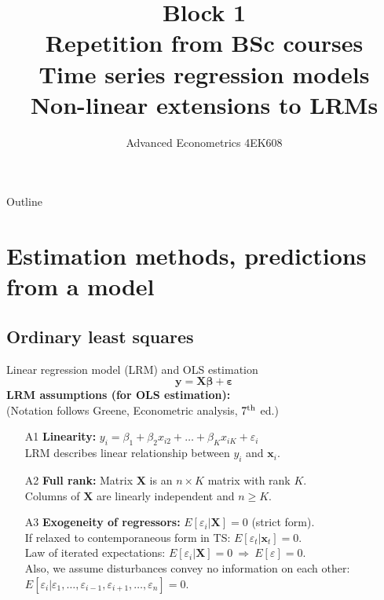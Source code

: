 \documentclass{beamer}
\title[Week1]{Block 1 \\  Repetition from BSc courses \\ Time series regression models \\ Non-linear extensions to LRMs}
\author{Advanced Econometrics 4EK608}
\institute{Vysoká škola ekonomická v Praze}
\date{}
\begin{document}
 
\begin{frame}
  \titlepage
\end{frame}

\begin{frame}{Outline}
  \tableofcontents
\end{frame}

\section{Estimation methods, predictions from a model}
\subsection{Ordinary least squares}
\begin{frame}{Linear regression model (LRM) and OLS estimation}
$$
\bm{y} = \bm{X\beta} + \bm{\varepsilon}
$$
\textbf{LRM assumptions (for OLS estimation):}\\
(Notation follows Greene, Econometric analysis, $7^{\textnormal{th}}$ ed.)
\medskip
\begin{enumerate}
    \item[A1] \textbf{Linearity:} $y_i = \beta_1 + \beta_2 x_{i2} + \dots + \beta_K x_{iK} + \varepsilon_i$ \\LRM describes linear relationship between $y_i$ and $\bm{x}_i$.
    \item[A2] \textbf{Full rank:} Matrix $\bm{X}$ is an $n \! \times \! K$ matrix with rank $K$.\\ Columns of $\bm{X}$ are linearly independent and $n \geq K$.
    \item[A3] \textbf{Exogeneity of regressors:} $E[\varepsilon_i | \bm{X}]=0$ (strict form). \\If relaxed to contemporaneous form in TS: $E[\varepsilon_t | \bm{x}_t]=0$.\\Law of iterated expectations: $E[\varepsilon_i | \bm{X}]=0 ~\Rightarrow~ E[\varepsilon]=0$.\\Also, we assume disturbances convey no information on each other: $E[\varepsilon_i|\varepsilon_1,\dots,\varepsilon_{i-1},\varepsilon_{i+1},\dots,\varepsilon_n]=0$.
\end{enumerate}
\end{frame}
\end{document}
